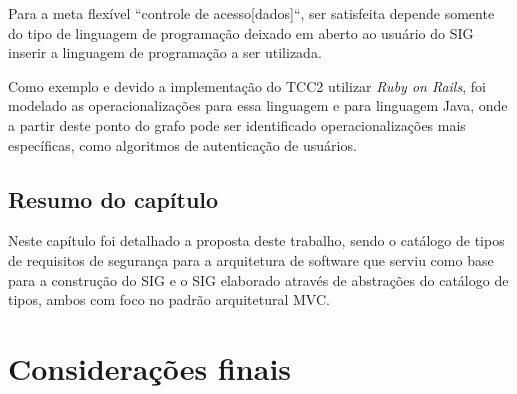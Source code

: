 Para a meta flexível ``controle de acesso[dados]``, ser satisfeita depende somente do tipo de linguagem de programação deixado em aberto ao usuário do SIG inserir a linguagem de programação a ser utilizada.

Como exemplo e devido a implementação do TCC2 utilizar \textit{Ruby on Rails}, foi modelado as operacionalizações para essa linguagem e para linguagem Java, onde a partir deste ponto do grafo pode ser identificado operacionalizações mais específicas, como algoritmos de autenticação de usuários.


\section{Resumo do capítulo}

Neste capítulo foi detalhado a proposta deste trabalho, sendo o catálogo de tipos de requisitos de segurança para a arquitetura de software que serviu como base para a construção do SIG e o SIG elaborado através de abstrações do catálogo de tipos, ambos com foco no padrão arquitetural MVC. 

\chapter{Considerações finais}
\label{chap:consideracoesFinais}